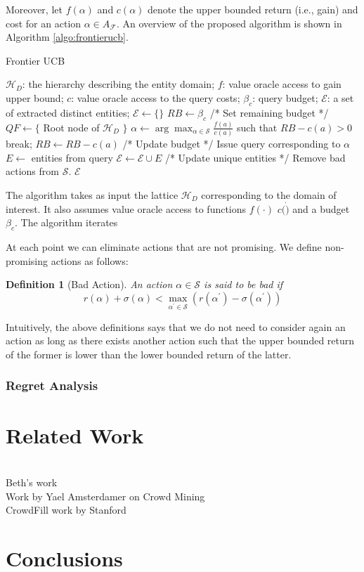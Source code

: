 \documentclass{vldb}
\newtheorem{definition}{Definition}
\newcommand{\hierarchy}{\mathcal{H}_D}
\newcommand{\uentities}{\mathcal{E}}
\begin{document}
Moreover, let $f(\alpha)$ and $c(\alpha)$ denote the upper bounded return (i.e., gain) and cost for an action $\alpha \in A_{\mathcal{F}}$. An overview of the proposed algorithm is shown in Algorithm \ref{algo:frontierucb}.

\begin{algorithm}[h]
\caption{Frontier UCB}
\label{algo:frontierucb}
\begin{algorithmic}[1]
 $\hierarchy$: the hierarchy describing the entity domain; $f$: value oracle access to gain upper bound; $c$: value oracle access to the query costs; $\beta_c$: query budget;
 $\uentities$: a set of extracted distinct entities;
\STATE $\uentities \leftarrow \{\}$
\STATE $RB \leftarrow \beta_c$ /* Set remaining budget */
\STATE $QF \leftarrow \{$ Root node of $\hierarchy$ $\}$
	\STATE $\alpha \leftarrow \arg\max_{\alpha \in {\mathcal{S}}} \frac{f(a)}{c(a)}$ such that $RB - c(a) >0$
		\STATE break;
	\ENDIF
	\STATE $RB \leftarrow RB - c(a)$ /* Update budget */
	\STATE Issue query corresponding to $\alpha$
	\STATE $E \leftarrow$ entities from query
	\STATE $\uentities \leftarrow \uentities \cup E$ /* Update unique entities */
	\STATE Remove bad actions from $\mathcal{S}$. 
\ENDWHILE
\RETURN $\uentities$
\end{algorithmic}
\end{algorithm}

The algorithm takes as input the lattice $\hierarchy$ corresponding to the domain of interest. It also assumes value oracle access to functions $f(\cdot)$ $c(\dot)$ and a budget $\beta_c$. The algorithm iterates 

At each point we can eliminate actions that are not promising. We define non-promising actions as follows:

\begin{definition}[Bad Action]
An action $\alpha \in \mathcal{S}$ is said to be bad if 
\begin{equation}
r(\alpha) + \sigma(\alpha) < \max_{\alpha^{\prime} \in \mathcal{S}} (r(\alpha^{\prime}) - \sigma(\alpha^{\prime}))
\end{equation}
\end{definition}
Intuitively, the above definitions says that we do not need to consider again an action as long as there exists another action such that the upper bounded return of the former is lower than the lower bounded return of the latter. 
\subsubsection{Regret Analysis}

\section{Related Work}
\label{sec:related}

\ \\Beth's work
\ \\Work by Yael Amsterdamer on Crowd Mining
\ \\CrowdFill work by Stanford

\section{Conclusions}
\label{sec:conclusions}




\end{document}
